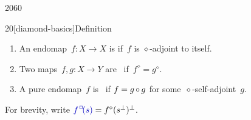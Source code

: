 \begin{parsec}{2060}
\begin{point}{20}[diamond-basics]{Definition}
\begin{enumerate}
    \item
    An endomap~$f\colon X \to X$ is 
        if~$f$ is $\diamond$-adjoint to itself.
    \item
    Two maps~$f,g\colon X \to Y$
        are~
        if~$f^\diamond = g^\diamond$.
    \item
        A pure endomap~$f$ is~
            if $f = g\mathop{\circ} g$ for some~$\diamond$-self-adjoint~$g$.
    \end{enumerate}
For brevity, write $\Define{f^\BOX(s)} = f^\diamond(s^\perp)^\perp$.
    \index{$(\ )^\BOX$}
\end{point}
\end{parsec}
